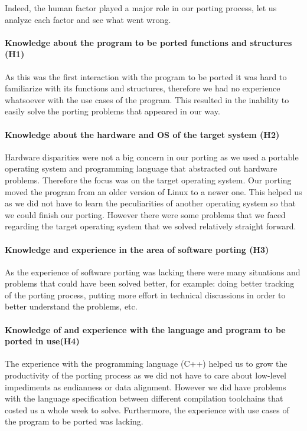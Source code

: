 Indeed, the human factor played a major role in our porting process, let
us analyze each factor and see what went wrong.

\paragraph{Knowledge about the program to be ported functions and structures
(H1)}
As this was the first interaction with the program to be ported it was
hard to familiarize with its functions and structures, therefore we had no
experience whatsoever with the use cases of the program. This resulted in the
inability to easily solve the porting problems that appeared in our way.

\paragraph{Knowledge about the hardware and OS of the target system (H2)}
Hardware disparities were not a big concern in our porting as we used a portable
operating system and programming language that abstracted out hardware problems.
Therefore the focus was on the target operating system. Our porting moved the
program from an older version of Linux to a newer one. This helped us as we
did not have to learn the peculiarities of another operating system so that we
could finish our porting. However there were some problems that we faced
regarding the target operating system that we solved relatively straight
forward.

\paragraph{Knowledge and experience in the area of software porting (H3)}
As the experience of software porting was lacking there were many situations
and problems that could have been solved better, for example: doing better
tracking of the porting process, putting more effort in technical discussions
in order to better understand the problems, etc.

\paragraph{Knowledge of and experience with the language and program to be ported
in use(H4)}
The experience with the programming language (C++) helped us to grow the
productivity of the porting process as we did not have to care about low-level
impediments as endianness or data alignment. However we did have problems with
the language specification between different compilation toolchains that costed
us a whole week to solve. Furthermore, the experience with use cases of the program
to be ported was lacking. 

